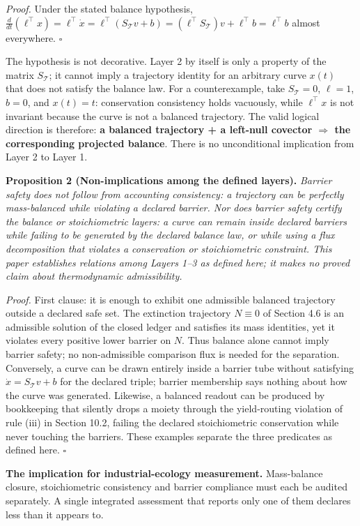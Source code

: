 \documentclass[11pt]{article}
\begin{document}
\emph{Proof.} Under the stated balance hypothesis, \(\frac{d}{dt}(\ell^\top x)=\ell^\top\dot x=\ell^\top(S_{\mathcal{T}}v+b)=(\ell^\top S_{\mathcal{T}})v+\ell^\top b=\ell^\top b\) almost everywhere. \(\square\)

The hypothesis is not decorative. Layer 2 by itself is only a property of the matrix \(S_{\mathcal{T}}\); it cannot imply a trajectory identity for an arbitrary curve \(x(t)\) that does not satisfy the balance law. For a counterexample, take \(S_{\mathcal{T}}=0\), \(\ell=1\), \(b=0\), and \(x(t)=t\): conservation consistency holds vacuously, while \(\ell^\top x\) is not invariant because the curve is not a balanced trajectory. The valid logical direction is therefore: \textbf{a balanced trajectory + a left-null covector \(\Rightarrow\) the corresponding projected balance}. There is no unconditional implication from Layer 2 to Layer 1.

\textbf{Proposition 2 (Non-implications among the defined layers).} \emph{Barrier safety does not follow from accounting consistency: a trajectory can be perfectly mass-balanced while violating a declared barrier. Nor does barrier safety certify the balance or stoichiometric layers: a curve can remain inside declared barriers while failing to be generated by the declared balance law, or while using a flux decomposition that violates a conservation or stoichiometric constraint. This paper establishes relations among Layers 1--3 as defined here; it makes no proved claim about thermodynamic admissibility.}

\emph{Proof.} First clause: it is enough to exhibit one admissible balanced trajectory outside a declared safe set. The extinction trajectory \(N\equiv0\) of Section 4.6 is an admissible solution of the closed ledger and satisfies its mass identities, yet it violates every positive lower barrier on \(N\). Thus balance alone cannot imply barrier safety; no non-admissible comparison flux is needed for the separation. Conversely, a curve can be drawn entirely inside a barrier tube without satisfying \(\dot x=S_{\mathcal{T}}v+b\) for the declared triple; barrier membership says nothing about how the curve was generated. Likewise, a balanced readout can be produced by bookkeeping that silently drops a moiety through the yield-routing violation of rule (iii) in Section 10.2, failing the declared stoichiometric conservation while never touching the barriers. These examples separate the three predicates as defined here. \(\square\)

\textbf{The implication for industrial-ecology measurement.} Mass-balance closure, stoichiometric consistency and barrier compliance must each be audited separately. A single integrated assessment that reports only one of them declares less than it appears to.
\end{document}
